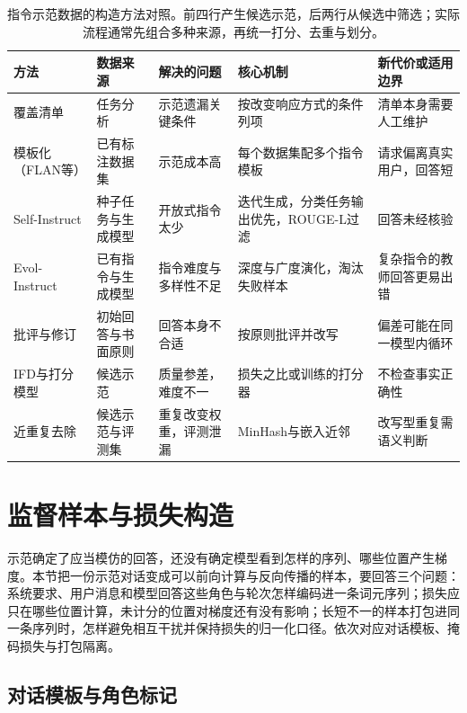 \begin{table}[htbp]
  \small
  \begin{tabularx}{\linewidth}{@{}p{24mm}p{30mm}p{36mm}p{36mm}X@{}}
    \toprule
    方法 & 数据来源 & 解决的问题 & 核心机制 & 新代价或适用边界\\
    \midrule
    覆盖清单 & 任务分析 & 示范遗漏关键条件 & 按改变响应方式的条件列项 & 清单本身需要人工维护\\
    模板化（FLAN等） & 已有标注数据集 & 示范成本高 & 每个数据集配多个指令模板 & 请求偏离真实用户，回答短\\
    Self-Instruct & 种子任务与生成模型 & 开放式指令太少 & 迭代生成，分类任务输出优先，ROUGE-L过滤 & 回答未经核验\\
    Evol-Instruct & 已有指令与生成模型 & 指令难度与多样性不足 & 深度与广度演化，淘汰失败样本 & 复杂指令的教师回答更易出错\\
    批评与修订 & 初始回答与书面原则 & 回答本身不合适 & 按原则批评并改写 & 偏差可能在同一模型内循环\\
    IFD与打分模型 & 候选示范 & 质量参差，难度不一 & 损失之比或训练的打分器 & 不检查事实正确性\\
    近重复去除 & 候选示范与评测集 & 重复改变权重，评测泄漏 & MinHash与嵌入近邻 & 改写型重复需语义判断\\
    \bottomrule
  \end{tabularx}
  \caption{指令示范数据的构造方法对照。前四行产生候选示范，后两行从候选中筛选；实际流程通常先组合多种来源，再统一打分、去重与划分。}
  \label{tab:nlp-sft-data-methods}
\end{table}

\section{监督样本与损失构造}
\label{sec:nlp-sft-objectives}

示范确定了应当模仿的回答，还没有确定模型看到怎样的序列、哪些位置产生梯度。本节把一份示范对话变成可以前向计算与反向传播的样本，要回答三个问题：系统要求、用户消息和模型回答这些角色与轮次怎样编码进一条词元序列；损失应只在哪些位置计算，未计分的位置对梯度还有没有影响；长短不一的样本打包进同一条序列时，怎样避免相互干扰并保持损失的归一化口径。依次对应对话模板、掩码损失与打包隔离。

\subsection{对话模板与角色标记}
\label{sec:nlp-sft-context}

